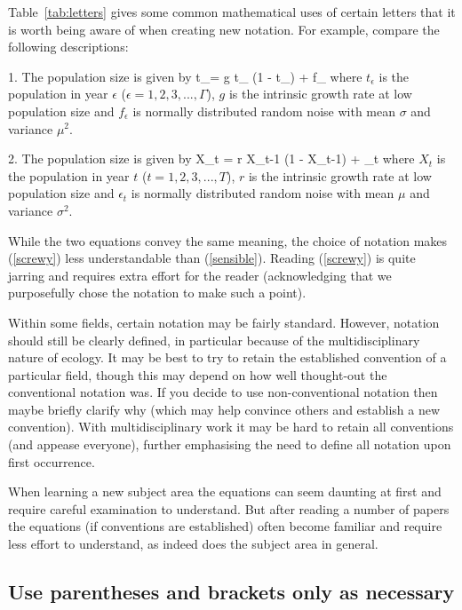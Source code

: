 Table~\ref{tab:letters} gives some common mathematical uses of certain letters
that it is worth being aware of when creating new notation.
For example, compare the following descriptions:

1. The population size is given by
\eb
t_\epsilon = g t_{} (1 - t_{}) + f_\epsilon
\label{screwy}
\ee
where $t_\epsilon$ is the population in year
$\epsilon$ ($\epsilon = 1, 2, 3, ..., \Gamma$), $g$ is the
intrinsic growth rate at low population size
and $f_\epsilon$ is normally distributed random noise with mean $\sigma$ and
variance $\mu^2$.

2. The population size is given by
\eb
X_t = r X_{t-1} (1 - X_{t-1}) + \epsilon_t
\label{sensible}
\ee
where $X_t$ is the population in year $t$ ($t = 1, 2, 3, ..., T$), $r$ is the
intrinsic growth rate at low population size
and $\epsilon_t$ is normally distributed random noise with mean $\mu$ and
variance $\sigma^2$.

While the two equations convey the same meaning, the choice of notation
makes (\ref{screwy}) less understandable than (\ref{sensible}).
Reading (\ref{screwy}) is quite jarring and requires extra effort for
the reader (acknowledging that we purposefully chose the notation
to make such a point).

Within some fields, certain notation may be fairly standard. However,
notation should still be clearly defined, in particular because
of the multidisciplinary nature of ecology.
It may be best to try to retain the established convention of a
particular field, though this may depend on how well thought-out the
conventional notation was. If you decide to use non-conventional notation
then maybe briefly clarify why (which may help convince others and establish
a new convention). With multidisciplinary work it may be hard to retain all
conventions (and appease everyone), further emphasising the need to define
all notation upon first occurrence.

When learning a new subject area the equations can seem
daunting at first and require careful examination to understand.
But after reading a number of papers the equations (if
conventions are established) often become familiar and require less effort to
understand, as indeed does the subject area in general.

\subsection*{Use parentheses and brackets only as necessary}

